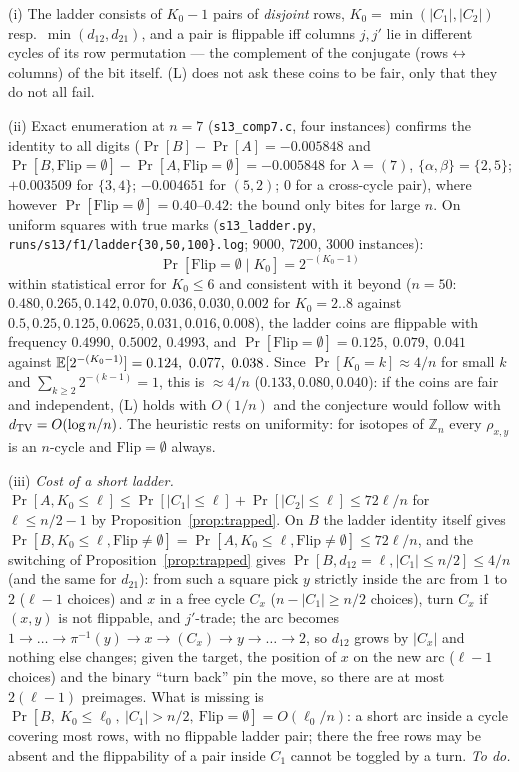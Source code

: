 \begin{remark}\label{rem:ladderdata}
(i) The ladder consists of $K_0-1$ pairs of \emph{disjoint} rows,
$K_0=\min(|C_1|,|C_2|)$ resp.\ $\min(d_{12},d_{21})$, and a pair is
flippable iff columns $j,j'$ lie in different cycles of its row
permutation --- the complement of the conjugate
(rows$\leftrightarrow$columns) of the bit itself.  (L) does not ask these coins to be fair, only that they
do not all fail.

(ii) Exact enumeration at $n=7$ (\texttt{s13\_comp7.c}, four
instances) confirms the identity to all digits
($\Pr[B]-\Pr[A]=-0.005848$ and $\Pr[B,\mathrm{Flip}=\emptyset]
-\Pr[A,\mathrm{Flip}=\emptyset]=-0.005848$ for $\lambda=(7)$,
$\{\alpha,\beta\}=\{2,5\}$; $+0.003509$ for $\{3,4\}$; $-0.004651$
for $(5,2)$; $0$ for a cross-cycle pair), where however
$\Pr[\mathrm{Flip}=\emptyset]=0.40$--$0.42$: the bound only bites for
large $n$.  On uniform squares with true marks
(\texttt{s13\_ladder.py}, \texttt{runs/s13/f1/ladder\{30,50,100\}.log};
$9000$, $7200$, $3000$ instances):
\[
\Pr[\mathrm{Flip}=\emptyset\mid K_0]=2^{-(K_0-1)}
\]
within statistical error for $K_0\le6$ and consistent with it beyond
($n=50$: $0.480,0.265,0.142,0.070,0.036,0.030,0.002$ for $K_0=2..8$
against $0.5,0.25,0.125,0.0625,0.031,0.016,0.008$), the ladder coins
are flippable with frequency $0.4990$, $0.5002$, $0.4993$, and
$\Pr[\mathrm{Flip}=\emptyset]=0.125,\ 0.079,\ 0.041$ against
$\E[2^{-(K_0-1)}]=0.124,\ 0.077,\ 0.038$.  Since $\Pr[K_0=k]\approx4/n$
for small $k$ and $\sum_{k\ge2}2^{-(k-1)}=1$, this is $\approx4/n$
($0.133,0.080,0.040$): if the coins are fair and independent, (L)
holds with $O(1/n)$ and the conjecture would follow with
$d_{\mathrm{TV}}=O(\log n/n)$.  The heuristic rests on uniformity: for
isotopes of $\mathbb Z_n$ every $\rho_{x,y}$ is an $n$-cycle and
$\mathrm{Flip}=\emptyset$ always.

(iii) \emph{Cost of a short ladder.}
$\Pr[A,K_0\le\ell]\le\Pr[|C_1|\le\ell]+\Pr[|C_2|\le\ell]\le72\ell/n$
for $\ell\le n/2-1$ by Proposition~\ref{prop:trapped}.  On $B$ the
ladder identity itself gives
$\Pr[B,K_0\le\ell,\mathrm{Flip}\ne\emptyset]
=\Pr[A,K_0\le\ell,\mathrm{Flip}\ne\emptyset]\le72\ell/n$, and the
switching of Proposition~\ref{prop:trapped} gives
$\Pr[B,d_{12}=\ell,|C_1|\le n/2]\le4/n$ (and the same for $d_{21}$):
from such a square pick $y$ strictly inside the arc from $1$ to $2$
($\ell-1$ choices) and $x$ in a free cycle $C_x$ ($n-|C_1|\ge n/2$
choices), turn $C_x$ if $(x,y)$ is not flippable, and $j'$-trade; the
arc becomes $1\to\dots\to\pi^{-1}(y)\to x\to(C_x)\to y\to\dots\to2$, so
$d_{12}$ grows by $|C_x|$ and nothing else changes; given the target,
the position of $x$ on the new arc ($\ell-1$ choices) and the binary
``turn back'' pin the move, so there are at most $2(\ell-1)$
preimages.  What is missing is
$\Pr[B,\ K_0\le\ell_0,\ |C_1|>n/2,\ \mathrm{Flip}=\emptyset]=O(\ell_0/n)$:
a short arc inside a cycle covering most rows, with no flippable
ladder pair; there the free rows may be absent and the flippability
of a pair inside $C_1$ cannot be toggled by a turn.  \emph{To do.}


\end{remark}
